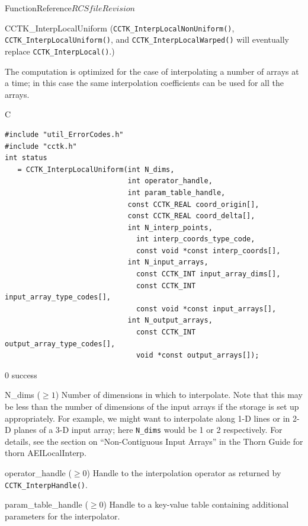 \begin{cactuspart}{FunctionReference}{$RCSfile$}{$Revision$}
\begin{FunctionDescription}{CCTK\_InterpLocalUniform}
(\verb|CCTK_InterpLocalNonUniform()|, \verb|CCTK_InterpLocalUniform()|,
and \verb|CCTK_InterpLocalWarped()| will eventually replace
\verb|CCTK_InterpLocal()|.)

The computation is optimized for the case of interpolating a
number of arrays at a time; in this case the same interpolation
coefficients can be used for all the arrays.

\begin{SynopsisSection}
\begin{Synopsis}{C}
\begin{verbatim}
#include "util_ErrorCodes.h"
#include "cctk.h"
int status
   = CCTK_InterpLocalUniform(int N_dims,
                             int operator_handle,
                             int param_table_handle,
                             const CCTK_REAL coord_origin[],
                             const CCTK_REAL coord_delta[],
                             int N_interp_points,
                               int interp_coords_type_code,
                               const void *const interp_coords[],
                             int N_input_arrays,
                               const CCTK_INT input_array_dims[],
                               const CCTK_INT input_array_type_codes[],
                               const void *const input_arrays[],
                             int N_output_arrays,
                               const CCTK_INT output_array_type_codes[],
                               void *const output_arrays[]);
\end{verbatim}
\end{Synopsis}
\end{SynopsisSection}

\begin{ResultSection}
\begin{Result}{\rm 0}
success
\end{Result}
\end{ResultSection}

\begin{ParameterSection}
\begin{Parameter}{N\_dims ($\ge 1$)}
Number of dimensions in which to interpolate.
Note that this may be less than the number of dimensions of the
input arrays if the storage is set up appropriately.  For example,
we might want to interpolate along 1-D lines or in 2-D planes of a
3-D input array; here \verb|N_dims| would be 1 or 2 respectively.
For details, see the section on ``Non-Contiguous Input Arrays''
in the Thorn Guide for thorn AEILocalInterp.
\end{Parameter}
\begin{Parameter}{operator\_handle ($\ge 0$)}
\hbox{}
Handle to the interpolation operator as returned by
\verb|CCTK_InterpHandle()|.
\end{Parameter}
\begin{Parameter}{param\_table\_handle ($\ge 0$)}
Handle to a key-value table containing additional parameters for
the interpolator.


\end{Parameter}
\end{ParameterSection}
\end{FunctionDescription}
\end{cactuspart}
